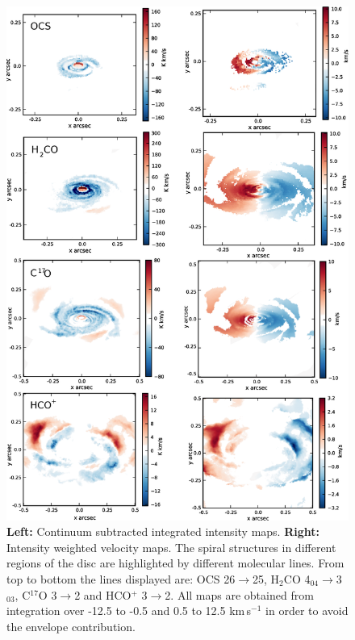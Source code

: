 \documentclass[useAMS,usenatbib]{mn2e}
\begin{document}
\begin{figure}
 \includegraphics[width=150mm]{Figures/sim/fig08.eps}
 \caption{{\bf Left:} Continuum subtracted integrated intensity maps. {\bf Right:} Intensity weighted velocity maps. The spiral structures in different regions of the disc are highlighted by different molecular lines. From top to bottom the lines displayed are: OCS 26$\rightarrow$25, H$_2$CO 4$_{04}$$\rightarrow$3$_{03}$, C$^{17}$O 3$\rightarrow$2 and HCO$^+$ 3$\rightarrow$2. All maps are obtained from integration over -12.5 to -0.5 and 0.5 to 12.5 km$\,$s$^{-1}$ in order to avoid the envelope contribution.}
 \label{sim_all}
\end{figure}
\end{document}
